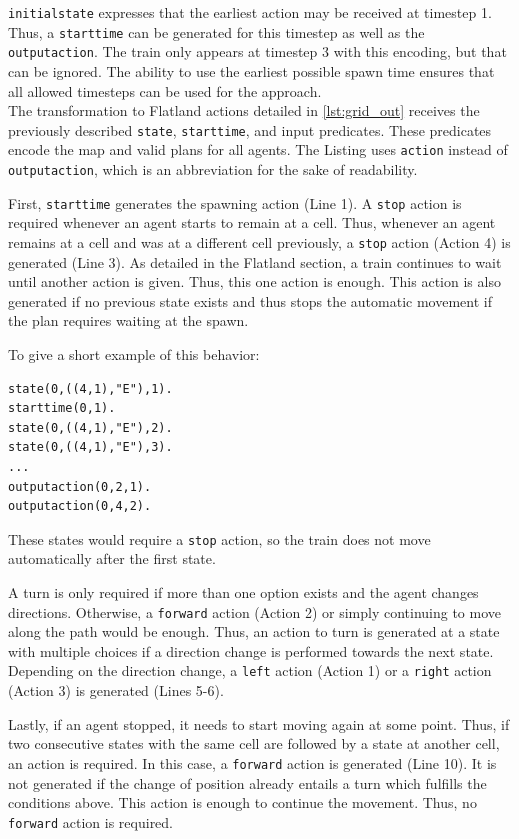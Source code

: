 \documentclass{llncs}
\begin{document}
\begin{multicols*}{2}
\texttt{initialstate} expresses that the earliest action may be received at timestep 1. Thus, a \texttt{starttime} can be generated for this timestep as well as the \texttt{outputaction}. The train only appears at timestep 3 with this encoding, but that can be ignored. The ability to use the earliest possible spawn time ensures that all allowed timesteps can be used for the approach.\\

The transformation to Flatland actions detailed in \ref{lst:grid_out} receives the previously described \texttt{state}, \texttt{starttime}, and input predicates. These predicates encode the map and valid plans for all agents. The Listing uses \texttt{action} instead of \texttt{outputaction}, which is an abbreviation for the sake of readability.

First, \texttt{starttime} generates the spawning action (Line 1). A \texttt{stop} action is required whenever an agent starts to remain at a cell. Thus, whenever an agent remains at a cell and was at a different cell previously, a \texttt{stop} action (Action 4) is generated (Line 3). As detailed in the Flatland section, a train continues to wait until another action is given. Thus, this one action is enough. This action is also generated if no previous state exists and thus stops the automatic movement if the plan requires waiting at the spawn.

To give a short example of this behavior:

\begin{verbatim}
state(0,((4,1),"E"),1).
starttime(0,1).
state(0,((4,1),"E"),2).
state(0,((4,1),"E"),3).
...
outputaction(0,2,1).
outputaction(0,4,2).
\end{verbatim}

These states would require a \texttt{stop} action, so the train does not move automatically after the first state.

A turn is only required if more than one option exists and the agent changes directions. Otherwise, a \texttt{forward} action (Action 2) or simply continuing to move along the path would be enough. Thus, an action to turn is generated at a state with multiple choices if a direction change is performed towards the next state. Depending on the direction change, a \texttt{left} action (Action 1) or a \texttt{right} action (Action 3) is generated (Lines 5-6).

Lastly, if an agent stopped, it needs to start moving again at some point. Thus, if two consecutive states with the same cell are followed by a state at another cell, an action is required. In this case, a \texttt{forward} action is generated (Line 10). It is not generated if the change of position already entails a turn which fulfills the conditions above. This action is enough to continue the movement. Thus, no \texttt{forward} action is required.\\


\end{multicols*}
\end{document}
